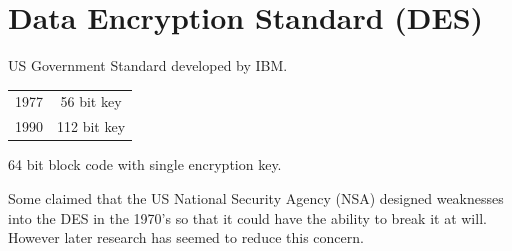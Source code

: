 \section{Data Encryption Standard (DES)}

US Government Standard developed by IBM.

\begin{tabular}{cc}
1977 &  56 bit key \\
1990 & 112 bit key \\
\end{tabular}

64 bit block code with single encryption key.

 Some claimed that the US National Security Agency (NSA) designed weaknesses into	%
the DES in the 1970's so that it could have the ability to break it at will.   However
later research has seemed to reduce this concern. 




%


